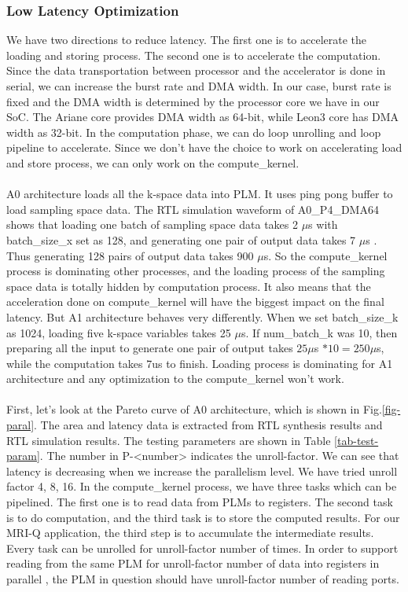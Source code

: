 \subsubsection{Low Latency Optimization}

We have two directions to reduce latency. The first one is to accelerate the
loading and storing process. The second one is to accelerate the
computation. Since the data transportation between processor and the accelerator
is done in serial, we can increase the burst rate and DMA width. In our case,
burst rate is fixed and the DMA width is determined by the processor core we
have in our SoC. The Ariane core provides DMA width as 64-bit, while Leon3 core
has DMA width as 32-bit. In the computation phase, we can do loop unrolling and
loop pipeline to accelerate. Since we don't have the choice to work on
accelerating load and store process, we can only work on the
compute\_kernel. \\ \\
%
A0 architecture loads all the k-space data into PLM. It uses ping pong buffer to
load sampling space data. The RTL simulation waveform of A0\_P4\_DMA64 shows
that loading one batch of sampling space data takes 2 $\mu$s with batch\_size\_x
set as 128, and generating one pair of output data takes 7 $\mu$s . Thus
generating 128 pairs of output data takes 900 $\mu$s. So the compute\_kernel
process is dominating other processes, and the loading process of the sampling
space data is totally hidden by computation process. It also means that the
acceleration done on compute\_kernel will have the biggest impact on the final
latency. But A1 architecture behaves very differently. When we set
batch\_size\_k as 1024, loading five k-space variables takes 25 $\mu$s. If
num\_batch\_k was 10, then preparing all the input to generate one pair of
output takes $25\mu$s $* 10 = 250\mu$s, while the computation takes 7us to
finish. Loading process is dominating for A1 architecture and any optimization
to the compute\_kernel won't work. \\ \\
%
First, let's look at the Pareto curve of A0 architecture, which is shown in
Fig.\ref{fig-paral}. The area and latency data is extracted from RTL synthesis
results and RTL simulation results. The testing parameters are shown in Table
\ref{tab-test-param}. The number in P-<number> indicates the unroll-factor. We
can see that latency is decreasing when we increase the parallelism level. We
have tried unroll factor 4, 8, 16. In the compute\_kernel process, we have three
tasks which can be pipelined. The first one is to read data from PLMs to
registers. The second task is to do computation, and the third task is to store
the computed results. For our MRI-Q application, the third step is to accumulate
the intermediate results. Every task can be unrolled for unroll-factor number of
times. In order to support reading from the same PLM for unroll-factor number of
data into registers in parallel , the PLM in question should have unroll-factor
number of reading ports.

